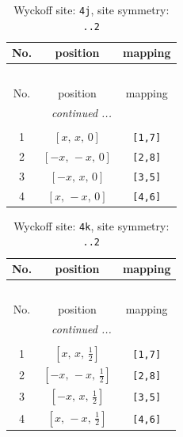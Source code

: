 \documentclass[fleqn,8pt]{jsarticle}
\begin{document}
\begin{longtable}{ccc}
\caption{Wyckoff site: {\tt 4j}, site symmetry: {\tt ..2}}
 \\
 \hline \hline
No. & position & mapping \\ \hline \endfirsthead

\multicolumn{2}{l}{\tablename\ \thetable{}} \\
 \hline \hline
No. & position & mapping \\ \hline \endhead

 \hline \hline
\multicolumn{2}{r}{\footnotesize\it continued ...} \\ \endfoot

 \hline \hline
\multicolumn{2}{r}{} \\ \endlastfoot

1 & $\left[ x,\, x,\, 0 \right]$ & {\tt [1,7]} \\ \hline
2 & $\left[ - x,\, - x,\, 0 \right]$ & {\tt [2,8]} \\ \hline
3 & $\left[ - x,\, x,\, 0 \right]$ & {\tt [3,5]} \\ \hline
4 & $\left[ x,\, - x,\, 0 \right]$ & {\tt [4,6]} \\
\end{longtable}
\renewcommand{\arraystretch}{1.2}
\begin{longtable}{ccc}
\caption{Wyckoff site: {\tt 4k}, site symmetry: {\tt ..2}}
 \\
 \hline \hline
No. & position & mapping \\ \hline \endfirsthead

\multicolumn{2}{l}{\tablename\ \thetable{}} \\
 \hline \hline
No. & position & mapping \\ \hline \endhead

 \hline \hline
\multicolumn{2}{r}{\footnotesize\it continued ...} \\ \endfoot

 \hline \hline
\multicolumn{2}{r}{} \\ \endlastfoot

1 & $\left[ x,\, x,\, \frac{1}{2} \right]$ & {\tt [1,7]} \\ \hline
2 & $\left[ - x,\, - x,\, \frac{1}{2} \right]$ & {\tt [2,8]} \\ \hline
3 & $\left[ - x,\, x,\, \frac{1}{2} \right]$ & {\tt [3,5]} \\ \hline
4 & $\left[ x,\, - x,\, \frac{1}{2} \right]$ & {\tt [4,6]} \\
\end{longtable}
\end{document}
